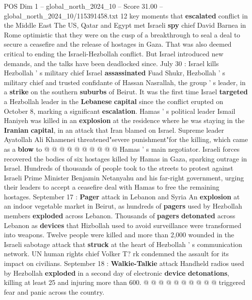 \begin{textsample}{POS Dim 1 – global\_north\_2024\_10 – Score 31.00 – global\_north\_2024\_10/115391458.txt}  \label{ex:f1_pos_081}
12 key moments that \textbf{escalated} conflict in the Middle East The US, Qatar and Egypt met Israeli \textbf{spy} chief David Barnea in Rome optimistic that they were on the cusp of a breakthrough to seal a deal to secure a ceasefire and the release of hostages in Gaza.
That was also deemed critical to ending the Israeli-Hezbollah conflict.
But Israel introduced new demands, and the talks have been deadlocked since.
July 30 : Israel kills Hezbollah ' s military chief Israel \textbf{assassinated} Fuad Shukr, Hezbollah ' s military chief and trusted confidante of Hassan Nasrallah, the group ' s leader, in a \textbf{strike} on the southern \textbf{suburbs} of Beirut.
It was the first time Israel \textbf{targeted} a Hezbollah leader in the \textbf{Lebanese} \textbf{capital} since the conflict erupted on October 8, marking a significant \textbf{escalation}.
Hamas ' s political leader Ismail Haniyeh was killed in an \textbf{explosion} at the residence where he was staying in the \textbf{Iranian} \textbf{capital}, in an attack that Iran blamed on Israel.
Supreme leader Ayatollah Ali Khamenei threatened"severe punishment"for the killing, which came as a \textbf{blow} to @ @ @ @ @ @ @ @ @ @ Hamas ' s main negotiator.
Israeli forces recovered the bodies of six hostages killed by Hamas in Gaza, sparking outrage in Israel.
Hundreds of thousands of people took to the streets to protest against Israeli Prime Minister Benjamin Netanyahu and his far-right government, urging their leaders to accept a ceasefire deal with Hamas to free the remaining hostages.
September 17 : \textbf{Pager} attack in Lebanon and Syria An \textbf{explosion} at an indoor vegetable market in Beirut, as hundreds of \textbf{pagers} used by Hezbollah members \textbf{exploded} across Lebanon.
Thousands of \textbf{pagers} \textbf{detonated} across Lebanon as \textbf{devices} that Hizbollah used to avoid surveillance were transformed into weapons.
Twelve people were killed and more than 2,000 wounded in the Israeli sabotage attack that \textbf{struck} at the heart of Hezbollah ' s communication network.
UN human rights chief Volker T? rk condemned the assault for its impact on civilians.
September 18 : \textbf{Walkie-Talkie} attack Handheld radios used by Hezbollah \textbf{exploded} in a second day of electronic \textbf{device} \textbf{detonations}, killing at least 25 and injuring more than 600. @ @ @ @ @ @ @ @ @ @ triggered fear and panic across the country.

\end{textsample}
